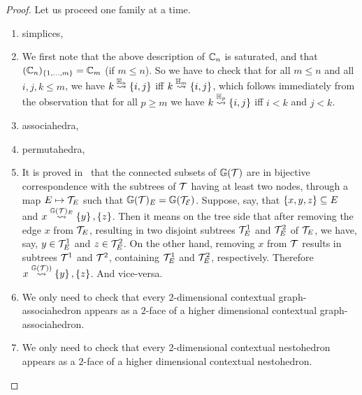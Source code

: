 \begin{proof}
  Let us proceed one family at a time.
  \begin{enumerate}
    \item simplices,
    \item We first note that the above description of ${\mathbb C}_n$ is saturated, and that $({\mathbb C}_n)_{\left\{1,\ldots,m\right\}}={\mathbb C}_m$ (if $m\leq n$).
    So we have to check that  for all $m\leq n$ and all $i,j,k\leq m$, we have $k\stackrel{{{\mathbb H}_n}}{\rightsquigarrow}\left\{i,j\right\}$ iff
    $k\stackrel{{{\mathbb H}_m}}{\rightsquigarrow}\left\{i,j\right\}$, which follows immediately from the observation that for all $p\geq m$ we have
    $k\stackrel{{{\mathbb H}_p}}{\rightsquigarrow}\left\{i,j\right\}$ iff $i<k$ and $j<k$.
    \item associahedra,
    \item permutahedra,
    \item It is proved in~\cite[Lem.~12]{COI} that the connected subsets of ${\mathbb G}({\cal T})$ are in bijective correspondence with the subtrees of $\cal T$ having at least two nodes, through a map $E\mapsto  {\cal T}_E$ such that ${\mathbb G}({\cal T})_E={\mathbb G}({\cal T_E})$. Suppose, say, that $\left\{x,y,z\right\}\subseteq E$ and $x\stackrel{{\mathbb G}({\cal T})_E}{\rightsquigarrow}\left\{y\right\},\left\{z\right\}$. Then it means on the tree side that after removing the edge $x$ from ${\cal T}_E$, resulting in two disjoint subtrees ${\cal T}_E^1$ and ${\cal T}_E^2$ of ${\cal T}_E$, we have, say, $y\in{\cal T}_E^1$ and $z\in{\cal T}_E^2$. 
    On the other hand, removing $x$ from ${\cal T}$ results in subtrees ${\cal T}^1$ and ${\cal T}^2$, containing ${\cal T}_E^1$ and ${\cal T}_E^2$, respectively. 
    Therefore $x\stackrel{{\mathbb G}({\cal T}))}{\rightsquigarrow}\left\{y\right\},\left\{z\right\}$. 
    And vice-versa.
    \item We only need to check that every $2$-dimensional contextual graph-associahedron appears as a $2$-face of a higher dimensional contextual graph-associahedron. 
    \item We only need to check that every $2$-dimensional contextual nestohedron appears as a $2$-face of a higher dimensional contextual nestohedron.
  \end{enumerate}
\end{proof}









